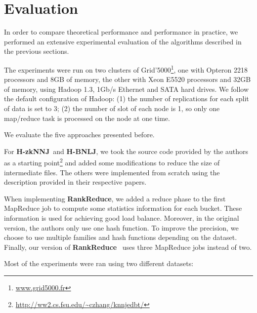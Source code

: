 \documentclass[10pt,journal,compsoc]{IEEEtran}
\newcommand{\TODO}[1]{\textcolor{red}{\textbf{[TODO:#1]}}}
\newcommand{\Z}{{\bf H-zkNNJ}}
\newcommand{\LSH}{{\bf RankReduce}}
\newcommand{\HBNLJ}{{\bf H-BNLJ}}
\begin{document}
\section{Evaluation}\label{evaluation}
In order to compare theoretical performance and performance in practice, we performed an extensive experimental evaluation of the algorithms described in the 
previous sections.

The experiments were run on two clusters of Grid'5000\footnote{\url{www.grid5000.fr}}, one with Opteron 2218 processors 
and 8GB of memory, the other with Xeon E5520 processors and 32GB of memory, using Hadoop 1.3, 1Gb/s Ethernet and SATA hard drives. %
We follow the default configuration of 
Hadoop: (1) the number of 
replications for each split of data is set 
to 3; (2) the number of slot of each node is 1, so only one map/reduce task is processed on the node at one time.

We evaluate the five approaches presented before.


 For \Z~and \HBNLJ, we took the source code provided by the authors as a starting 
point\footnote{\url{http://ww2.cs.fsu.edu/~czhang/knnjedbt/}} and added some modifications to reduce the size of 
intermediate files. The others were implemented from scratch using the 
description provided in their respective papers.

When implementing \LSH, we added a reduce phase to the first MapReduce job to compute some statistics information for 
each bucket. These information is used for achieving good load balance. %
Moreover, in the original version, the authors only use one 
hash function. To improve the precision, we choose to use multiple families and hash functions depending on the 
dataset. Finally, our version of \LSH~ uses three MapReduce jobs instead of two.

Most of the experiments were ran using two different datasets: 
\end{document}

